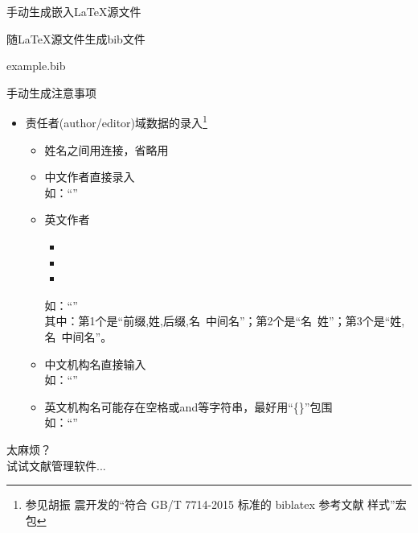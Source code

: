 \documentclass[fontset = none, t]{ctexbeamer}
\begin{document}
\begin{frame}[fragile]{手动生成}{嵌入\LaTeX 源文件}
\begin{spacing}{1.3}
\begin{center}
\begin{minipage}[h]{0.55\linewidth}
\begin{textcb}{随\LaTeX 源文件生成bib文件}
\begin{filecontents}{example.bib}
\begin{frame}[fragile]{手动生成}{注意事项}
  \begin{spacing}{1.2}
    \begin{itemize}
    \item 责任者(author/editor)域数据的录入\footnote[frame,2]{参见胡振
        震开发的\enquote{符合 GB/T 7714-2015 标准的 biblatex 参考文献
          样式}宏包}
      \begin{itemize}
      \item 姓名之间用连接，省略用
      \item 中文作者直接录入\\
        {\tiny 如：}\enquote{}
      \item 英文作者
        \begin{itemize}
        \item {}
        \item {}
        \item {}
        \end{itemize}
        {\tiny 如：}\enquote{}\\
        {\tiny 其中：第1个是\enquote{前缀,姓,后缀,名\ 中间名}；第2个是\enquote{名\ 姓}；第3个是\enquote{姓,名\ 中间名}。}%
      \item 中文机构名直接输入\\
        {\tiny 如：}\enquote{}
      \item 英文机构名可能存在空格或and等字符串，最好用\enquote{\{\}}包围\\
        {\tiny 如：}\enquote{}
      \end{itemize}
    \end{itemize}    
  \end{spacing}  
\end{frame}

\begin{frame}
  太麻烦？\\
  试试文献管理软件...
\end{frame}

\end{filecontents}
\end{textcb}
\end{minipage}
\end{center}
\end{spacing}
\end{frame}
\end{document}
